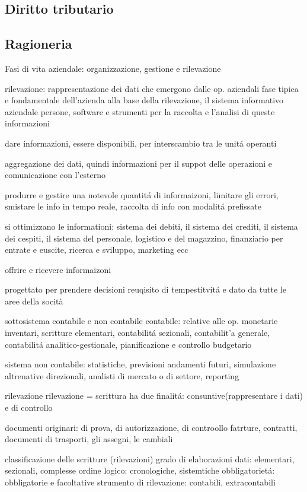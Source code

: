 \documentclass{article}
\begin{document}
\subsection{Diritto tributario}

\subsection{Ragioneria}
Fasi di vita aziendale: organizzazione, gestione e rilevazione

rilevazione: rappresentazione dei dati che emergono dalle op. aziendali
fase tipica e fondamentale dell'azienda
alla base della rilevazione, il sistema informativo aziendale
persone, software e strumenti per la raccolta e l'analisi di queste informazioni

dare informazioni, essere disponibili, per interscambio tra le unit\'a operanti

aggregazione dei dati, quindi informazioni per il suppot delle operazioni e comunicazione con l'esterno

produrre e gestire una notevole quantit\'a di informaizoni, limitare gli errori, smistare le info in tempo reale, raccolta di info con modalit\'a prefissate

si ottimizzano le informationi: sistema dei debiti, il sistema dei crediti, il sistema dei cespiti, il sistema del personale, logistico e del magazzino, finanziario per entrate e euscite, ricerca e sviluppo, marketing ecc

offrire e ricevere informaizoni

progettato per prendere decisioni
reuqisito di tempestitvit\'a e dato da tutte le aree della socità

sottosistema contabile e non contabile
contabile: relative alle op. monetarie
inventari, scritture elementari, contabilit\'a sezionali, contabilit'a generale, contabilit\'a analitico-gestionale, pianificazione e controllo budgetario

sistema non contabile: statistiche, previsioni andamenti futuri, simulazione altrenative direzionali, analisti di mercato o di settore, reporting

rilevazione
rilevazione = scrittura
ha due finalit\'a: consuntive(rappresentare i dati) e di controllo

documenti originari: di prova, di autorizzazione, di controollo
fatrture, contratti, documenti di trasporti, gli assegni, le cambiali

classificazione delle scritture (rilevazioni)
grado di elaborazioni dati: elementari, sezionali, complesse
ordine logico: cronologiche, sistemtiche
obbligatoriet\'a: obbligatorie e facoltative
strumento di rilevazione: contabili, extracontabili
\end{document}
